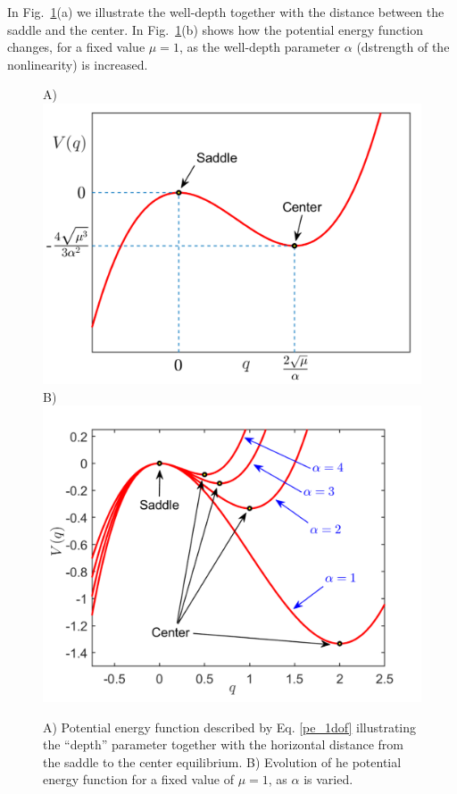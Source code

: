\documentclass{ws-ijbc}
\begin{document}
In Fig.~\ref{pes_1dof_alpha}(a) we illustrate the well-depth together with the distance between the saddle and the center. In Fig.~\ref{pes_1dof_alpha}(b) shows how the potential energy function changes, for a fixed value $\mu = 1$, as the well-depth parameter $\alpha$ (dstrength of the nonlinearity) is increased.
\begin{figure}[htbp]
	\begin{center}
		A) \includegraphics[scale=0.3]{fig3a}
		B) \includegraphics[scale=0.29]{fig3b}
	\end{center}
	\caption{A) Potential energy function described by Eq. \eqref{pe_1dof} illustrating the ``depth'' parameter together with the horizontal distance from the saddle to the center equilibrium. B) Evolution of he potential energy function for a fixed value of $\mu = 1$, as $\alpha$ is varied.}
	\label{pes_1dof_alpha}
\end{figure} 
\end{document}
